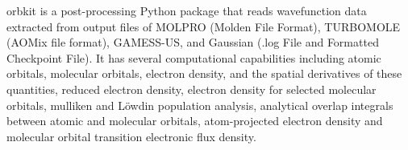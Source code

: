 orbkit is a post-processing Python package that reads wavefunction data extracted from output files of MOLPRO (Molden File Format), TURBOMOLE (AOMix file format), GAMESS-US, and Gaussian (.log File and Formatted Checkpoint File). It has several computational capabilities including atomic orbitals, molecular orbitals, electron density, and the spatial derivatives of these quantities, reduced electron density, electron density for selected molecular orbitals, mulliken and Löwdin population analysis, analytical overlap integrals between atomic and molecular orbitals, atom-projected electron density and molecular orbital transition electronic flux density.
